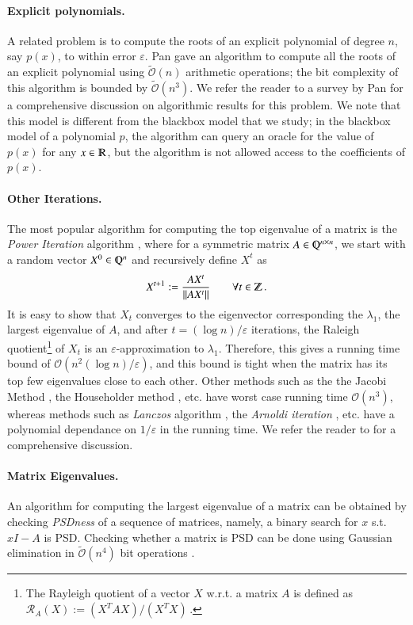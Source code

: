\documentclass{article}[12pt]
\theoremstyle{definition}
\renewcommand{\mathbb}{\varmathbb}
\newcommand{\mper}{\,.}
\newcommand{\norm}[1]{\left\lVert#1\right\rVert}
\newcommand{\defeq}{\stackrel{\textup{def}}{=}}
\newcommand{\Z}{{\mathbb Z}}
\newcommand{\R}{\mathbb R}
\newcommand{\Q}{\mathbb Q}
\newcommand{\e}{\epsilon}
\let\e\varepsilon
\newcommand{\bigO}{\mathcal{O}}
\newcommand{\bigo}[1]{\bigO\left(#1\right)}
\newcommand{\tbigO}{\tilde{\mathcal{O}}}
\newcommand{\tbigo}[1]{\tbigO\left(#1\right)}
\renewcommand{\defeq}{:=}
\newcommand{\ralsymb}{\mathscr{R}}
\begin{document}
\paragraph{Explicit polynomials.} A related problem is to compute the roots of an explicit polynomial of degree $n$, say $p(x)$, to within error $\e$.
Pan \cite{p96} gave an algorithm to compute all the roots of an explicit polynomial
using $\tbigo{n}$ arithmetic operations;
the bit complexity of this algorithm is bounded by $\tbigo{n^3}$.  
We refer the reader to a survey by Pan \cite{p97} for a comprehensive discussion on 
algorithmic results for this problem.
We note that this model is different from the blackbox model that we study;
in the blackbox model of a polynomial $p$, the algorithm can query an oracle for the
value of $p(x)$ for any $x \in \R$, but the algorithm is not allowed access to the coefficients of $p(x)$. 

\paragraph{Other Iterations.}
The most popular algorithm for computing the top eigenvalue of a matrix is the 
{\em Power Iteration} algorithm \cite{mp29}, where for a symmetric matrix $A \in \Q^{n \times n}$,
we start with a random vector $X^0 \in \Q^n$ and recursively define $X^t$ as
\[ X^{t+1} \defeq \frac{ A X^t }{ \norm{A X^t}  } \qquad \forall t \in \Z \mper  \] 
It is easy to show that $X_t$ converges to the eigenvector corresponding the $\lambda_1$, the largest 
eigenvalue of $A$, and after $t = (\log n)/\e$ iterations, the Raleigh 
quotient\footnote{The Rayleigh quotient of a vector $X$ w.r.t. a matrix $A$ is defined as 
$ \ralsymb_A(X) \defeq (X^T A X) / (X^T X) \mper $ } 
of $X_t$  is an $\e$-approximation to $\lambda_1$. Therefore, this gives a running time
bound of $\bigo{n^2 (\log n)/\e}$, and this bound is tight when the matrix has its top few 
eigenvalues close to each other. 
Other methods such as the the Jacobi Method \cite{r71}, the Householder method \cite{h70}, etc. 
have worst case running time $\bigo{n^3}$, whereas methods such as 
{\em Lanczos} algorithm \cite{l50}, the {\em Arnoldi iteration} \cite{a51}, etc.
have a polynomial dependance on $1/\e$ in the running time.
We refer the reader to \cite{ptvf92} for a comprehensive discussion.

\paragraph{Matrix Eigenvalues.}
An algorithm for computing the largest eigenvalue of a matrix 
can be obtained by checking {\em PSDness} of a sequence of matrices, namely, a binary search 
for $x$ s.t. $xI-A$ is PSD. Checking whether a matrix is PSD can be done using Gaussian elimination 
in $\tbigo{n^4}$ bit operations \cite{e67}.
\end{document}
